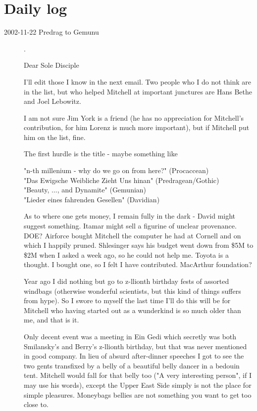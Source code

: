 

\chapter{Daily log}
\label{c-dailyBlog}

\begin{description}

\item[2002-11-22 Predrag to Gemunu].

Dear Sole Disciple

I'll edit those I know in the next email. Two people who I do not think
are in the list, but who helped Mitchell at important junctures are
Hans Bethe
and
Joel Lebowitz.

I am not sure Jim York is a friend (he has no appreciation for Mitchell's
contribution, for him Lorenz is much more important), but if Mitchell put
him on the list, fine.

The first hurdle is the title - maybe something like

\noindent
"n-th millenium - why do we go on from here?" (Procaccean)\\
"Das Ewigsche Weibliche Zieht Uns hinan" (Predragean/Gothic)\\
"Beauty, ..., and Dynamite" (Gemunian)\\
"Lieder eines fahrenden Gesellen" (Davidian)

As to where one gets money, I remain fully in the dark -
David might suggest something. Itamar might sell a figurine of unclear
provenance. DOE? Airforce bought Mitchell the computer he had at Cornell
and on which I happily pruned. Shlesinger says his budget went down from
\$5M to \$2M when I asked a week ago, so he could not help me. Toyota is a
thought. I bought one, so I felt I have contributed. MacArthur foundation?

Year ago I did nothing but go to z-llionth birthday fests of assorted
windbags (otherwise wonderful scientists, but this kind of things suffers
from hype). So I swore to myself the last time I'll do this will be for
Mitchell who having started out as a wunderkind is so much older than me,
and that is it.

Only decent event was a meeting in Ein Gedi which secretly was both
Smilansky's and Berry's z-llionth birthday, but that was never mentioned in
good company. In lieu of absurd after-dinner speeches I got to see the two
gents transfixed by a belly of a beautiful belly dancer in a bedouin tent.
Mitchell would fall for that belly too ("A very interesting person", if I
may use his words), except the Upper East Side simply is not the place for
simple pleasures. Moneybags bellies are not something you want to get too
close to.


\end{description}
